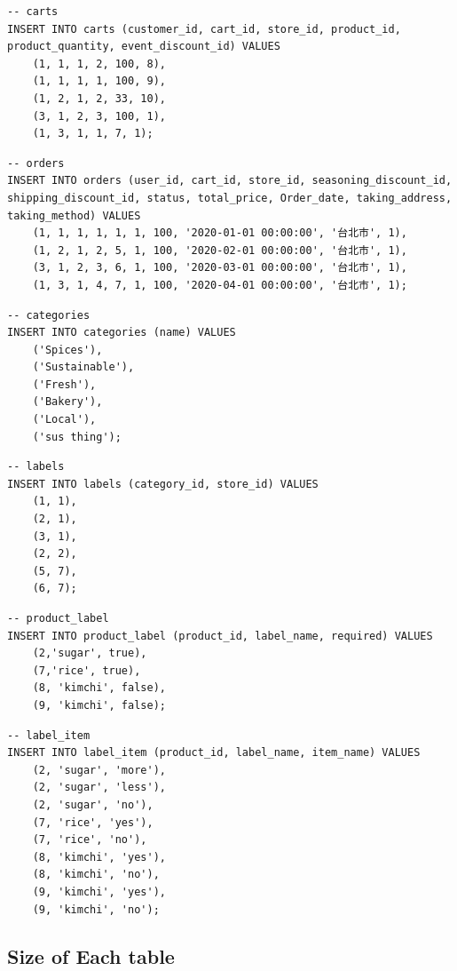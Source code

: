 \documentclass[a4paper, 12pt]{article}
\begin{document}
\begin{lstlisting}
-- carts
INSERT INTO carts (customer_id, cart_id, store_id, product_id, product_quantity, event_discount_id) VALUES
    (1, 1, 1, 2, 100, 8),
    (1, 1, 1, 1, 100, 9),
    (1, 2, 1, 2, 33, 10),
    (3, 1, 2, 3, 100, 1),
    (1, 3, 1, 1, 7, 1);
\end{lstlisting}

\begin{lstlisting}
-- orders
INSERT INTO orders (user_id, cart_id, store_id, seasoning_discount_id, shipping_discount_id, status, total_price, Order_date, taking_address, taking_method) VALUES 
    (1, 1, 1, 1, 1, 1, 100, '2020-01-01 00:00:00', '台北市', 1),
    (1, 2, 1, 2, 5, 1, 100, '2020-02-01 00:00:00', '台北市', 1),
    (3, 1, 2, 3, 6, 1, 100, '2020-03-01 00:00:00', '台北市', 1),
    (1, 3, 1, 4, 7, 1, 100, '2020-04-01 00:00:00', '台北市', 1);
\end{lstlisting}

\begin{lstlisting}
-- categories
INSERT INTO categories (name) VALUES
    ('Spices'),
    ('Sustainable'),
    ('Fresh'),
    ('Bakery'),
    ('Local'),
    ('sus thing');
\end{lstlisting}

\begin{lstlisting}
-- labels
INSERT INTO labels (category_id, store_id) VALUES
    (1, 1),
    (2, 1),
    (3, 1),
    (2, 2),
    (5, 7),
    (6, 7);
\end{lstlisting}

\begin{lstlisting}
-- product_label
INSERT INTO product_label (product_id, label_name, required) VALUES
    (2,'sugar', true),
    (7,'rice', true),
    (8, 'kimchi', false),
    (9, 'kimchi', false);
\end{lstlisting}

\begin{lstlisting}
-- label_item
INSERT INTO label_item (product_id, label_name, item_name) VALUES
    (2, 'sugar', 'more'),
    (2, 'sugar', 'less'),
    (2, 'sugar', 'no'),
    (7, 'rice', 'yes'),
    (7, 'rice', 'no'),
    (8, 'kimchi', 'yes'),
    (8, 'kimchi', 'no'),
    (9, 'kimchi', 'yes'),
    (9, 'kimchi', 'no');
\end{lstlisting}

\newpage

\subsection{Size of Each table}
\end{document}
